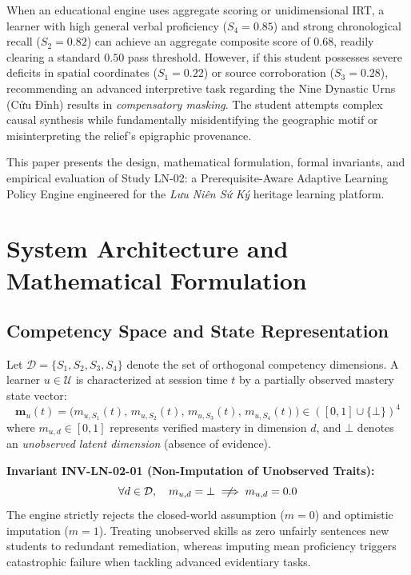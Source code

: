 \documentclass[11pt,a4paper]{article}
\begin{document}
When an educational engine uses aggregate scoring or unidimensional IRT, a learner with high general verbal proficiency ($S_4 = 0.85$) and strong chronological recall ($S_2 = 0.82$) can achieve an aggregate composite score of $0.68$, readily clearing a standard $0.50$ pass threshold. However, if this student possesses severe deficits in spatial coordinates ($S_1 = 0.22$) or source corroboration ($S_3 = 0.28$), recommending an advanced interpretive task regarding the Nine Dynastic Urns (Cửu Đỉnh) results in \textit{compensatory masking}. The student attempts complex causal synthesis while fundamentally misidentifying the geographic motif or misinterpreting the relief's epigraphic provenance.

This paper presents the design, mathematical formulation, formal invariants, and empirical evaluation of Study LN-02: a Prerequisite-Aware Adaptive Learning Policy Engine engineered for the \textit{Lưu Niên Sứ Ký} heritage learning platform.

\section{System Architecture and Mathematical Formulation}

\subsection{Competency Space and State Representation}

Let $\mathcal{D} = \{S_1, S_2, S_3, S_4\}$ denote the set of orthogonal competency dimensions. A learner $u \in \mathcal{U}$ is characterized at session time $t$ by a partially observed mastery state vector:
\begin{equation}
    \mathbf{m}_u(t) = \big( m_{u, S_1}(t),\, m_{u, S_2}(t),\, m_{u, S_3}(t),\, m_{u, S_4}(t) \big) \in ([0, 1] \cup \{\bot\})^4
\end{equation}
where $m_{u, d} \in [0, 1]$ represents verified mastery in dimension $d$, and $\bot$ denotes an \textit{unobserved latent dimension} (absence of evidence). 

\textbf{Invariant INV-LN-02-01 (Non-Imputation of Unobserved Traits):}
\begin{equation}
    \forall d \in \mathcal{D},\quad m_{u, d} = \bot \centernot\implies m_{u, d} = 0.0
\end{equation}
The engine strictly rejects the closed-world assumption ($m = 0$) and optimistic imputation ($m = 1$). Treating unobserved skills as zero unfairly sentences new students to redundant remediation, whereas imputing mean proficiency triggers catastrophic failure when tackling advanced evidentiary tasks.
\end{document}
